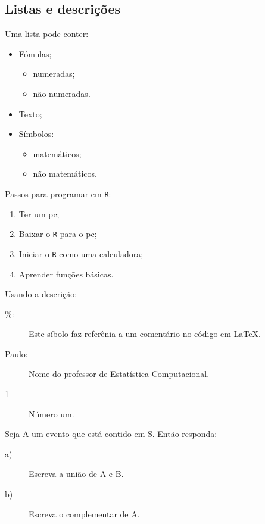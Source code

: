 \documentclass{article}
\begin{document}
\subsection{Listas e descrições}

Uma lista pode conter:

\begin{itemize}
    \item Fómulas;
    \begin{itemize}
        \item numeradas;
        \item não numeradas.        
    \end{itemize}
    \item Texto;
    \item Símbolos:
    \begin{itemize}
        \item matemáticos;
        \item não matemáticos.        
    \end{itemize} 
\end{itemize}


Passos para programar em \texttt{R}:

\begin{enumerate}
    \item Ter um pc;
    \item Baixar o \texttt{R} para o pc;
    \item Iniciar o \texttt{R} como uma calculadora;
    \item Aprender funções básicas.
\end{enumerate}

Usando a descrição:

\begin{description}
    \item[\%:] Este síbolo faz referênia a um comentário no código em \LaTeX.
    \item[Paulo:] Nome do professor de Estatística Computacional.
    \item[1] Número um.
\end{description}


Seja A um evento que está contido em S. Então responda:

\begin{description}
    \item[a)] Escreva a união de A e B.
    \item[b)] Escreva o complementar de A.
\end{description}
\end{document}

